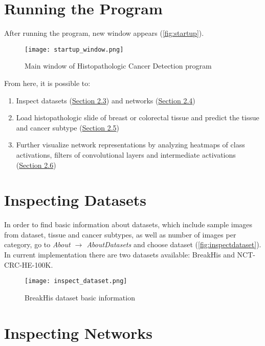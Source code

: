 \section{Running the Program}

After running the program, new window appears (\textcolor{red}{\autoref{fig:startup}}).

\begin{figure}[h]
	\hspace*{0.5cm}
	\centering
	\texttt{[image: startup\_window.png]}
	\caption{Main window of Histopathologic Cancer Detection program}
	\label{fig:startup}
\end{figure}

From here, it is possible to:
\begin{enumerate}
	\itemsep 0em
	\item Inspect datasets (\textcolor{red}{\hyperref[inspdata]{Section 2.3}}) and networks (\textcolor{red}{\hyperref[inspnets]{Section 2.4}})
	\item Load histopathologic slide of breast or colorectal tissue and predict the tissue and cancer subtype (\textcolor{red}{\hyperref[basicuse]{Section 2.5}})
	\item Further visualize network representations by analyzing heatmaps of class activations, filters of convolutional layers and intermediate activations\\ (\textcolor{red}{\hyperref[advuse]{Section 2.6}})
\end{enumerate}
\clearpage

\section{Inspecting Datasets}
\label{inspdata}

In order to find basic information about datasets, which include sample images from dataset, tissue and cancer subtypes, as well as number of images per category, go to \emph{About $\rightarrow$ About\;Datasets} and choose dataset (\textcolor{red}{\autoref{fig:inspectdataset}}). In current implementation there are two datasets available: BreakHis and NCT-CRC-HE-100K.

\begin{figure}[h]
	\centering
	\texttt{[image: inspect\_dataset.png]}
	\caption{BreakHis dataset basic information}
	\label{fig:inspectdataset}
\end{figure}

\section{Inspecting Networks}
\label{inspnets}

